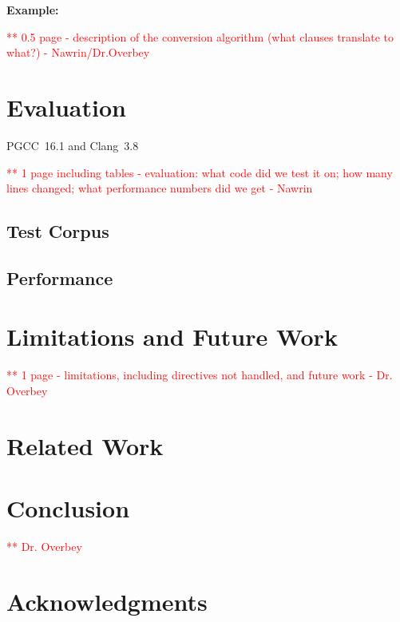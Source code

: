 \documentclass{sig-alternate-05-2015}
\newcommand\todo[1]{\textcolor{red}{** #1}}
\begin{document}
\textbf{Example:}

\todo{0.5 page - description of the conversion algorithm (what clauses translate to what?) - Nawrin/Dr.Overbey} 
\section{Evaluation}
\label{sec:eval}

PGCC~16.1 and Clang~3.8

\todo{1 page including tables - evaluation: what code did we test it on; how many lines changed; what performance numbers did we get - Nawrin}
\subsection{Test Corpus}
\subsection{Performance}


\section{Limitations and Future Work}
\label{sec:future}
\todo{1 page - limitations, including directives not handled, and future work - Dr. Overbey}

\section{Related Work}
\section{Conclusion}
\todo{Dr. Overbey}

\section{Acknowledgments}


%

%
%
\end{document}

